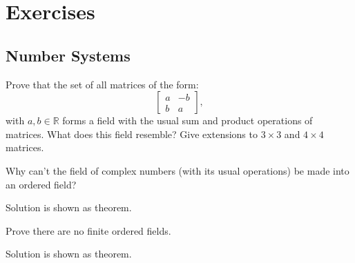 \section{Exercises}

\subsection{Number Systems}

  \begin{exercise}
    Prove that the set of all matrices of the form:
    \begin{equation}
      \begin{bmatrix}
        a & -b \\
        b & a
      \end{bmatrix},
    \end{equation}
    with $a,b \in \mathbb{R}$ forms a field with the usual sum and product operations of
    matrices. What does this field resemble? Give extensions to $3 \times 3$ and
    $4 \times 4$ matrices.
  \end{exercise}
  \begin{solution}
    
  \end{solution}

  \begin{exercise}
    Why can't the field of complex numbers (with its usual operations) be
    made into an ordered field?
  \end{exercise}
  \begin{solution}
    Solution is shown as theorem. 
  \end{solution}

  \begin{exercise}
    Prove there are no finite ordered fields.
  \end{exercise}
  \begin{solution}
    Solution is shown as theorem. 
  \end{solution}


